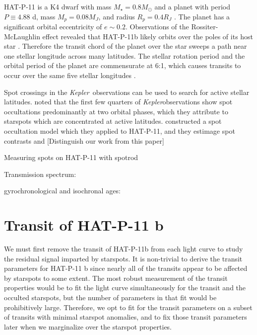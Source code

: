 \documentclass[iop]{emulateapj}
\newcommand{\kepler}{\textit{Kepler}}
\begin{document}
HAT-P-11 is a K4 dwarf with mass $M_\star = 0.8 M_\odot$ and a planet with period $P \equiv 4.88$ d, mass $M_p=0.08 M_J$, and radius $R_p = 0.4 R_J$ \citep{bakos2010}. The planet has a significant orbital eccentricity of $e \sim 0.2$. Observations of the Rossiter-McLaughlin effect revealed that HAT-P-11b likely orbits over the poles of its host star \citep{Winn2010, Hirano2011, Sanchis-Ojeda2011}. Therefore the transit chord of the planet over the star sweeps a path near one stellar longitude across many latitudes. The stellar rotation period and the orbital period of the planet are commensurate at 6:1, which causes transits to occur over the same five stellar longitudes \citep{Beky2014a}.

Spot crossings in the \kepler\ observations can be used to search for active stellar latitudes. \citet{Sanchis-Ojeda2011, Deming2011} noted that the first few quarters of \kepler observations show spot occultations predominantly at two orbital phases, which they attribute to starspots which are concentrated at active latitudes. \cite{Beky2014b} constructed a spot occultation model which they applied to HAT-P-11, and they estimage spot contrasts and [Distinguish our work from this paper]

Measuring spots on HAT-P-11 with spotrod \citep{Beky2014b}

Transmission spectrum: \citep{Fraine2014}

gyrochronological and isochronal ages: \citep{Maxted2014}

\citep{Huber2010}

\section{Transit of HAT-P-11 \lowercase{b}} \label{sec:transit}

We must first remove the transit of HAT-P-11b from each light curve to study the residual signal imparted by starspots. It is non-trivial to derive the transit parameters for HAT-P-11 b since nearly all of the transits appear to be affected by starspots to some extent. The most robust measurement of the transit properties would be to fit the light curve simultaneously for the transit and the occulted starspots, but the number of parameters in that fit would be prohibitively large. Therefore, we opt to fit for the transit parameters on a subset of transits with minimal starspot anomalies, and to fix those transit parameters later when we marginalize over the starspot properties.
\end{document}
